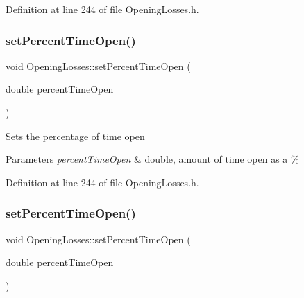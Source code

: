 Definition at line 244 of file Opening\+Losses.\+h.

\mbox{\label{class_opening_losses_a889b6aa25bf6d8fc8fb284ec0c2a1625}} 
\subsubsection{\texorpdfstring{set\+Percent\+Time\+Open()}{setPercentTimeOpen()}\hspace{0.1cm}{\footnotesize\ttfamily [2/3]}}
{\footnotesize\ttfamily void Opening\+Losses\+::set\+Percent\+Time\+Open (\begin{DoxyParamCaption}\item[{double}]{percent\+Time\+Open }\end{DoxyParamCaption})\hspace{0.3cm}{\ttfamily [inline]}}

Sets the percentage of time open 
\begin{DoxyParams}{Parameters}
{\em percent\+Time\+Open} & double, amount of time open as a \% \\
\hline
\end{DoxyParams}


Definition at line 244 of file Opening\+Losses.\+h.

\mbox{\label{class_opening_losses_a889b6aa25bf6d8fc8fb284ec0c2a1625}} 
\subsubsection{\texorpdfstring{set\+Percent\+Time\+Open()}{setPercentTimeOpen()}\hspace{0.1cm}{\footnotesize\ttfamily [3/3]}}
{\footnotesize\ttfamily void Opening\+Losses\+::set\+Percent\+Time\+Open (\begin{DoxyParamCaption}\item[{double}]{percent\+Time\+Open }\end{DoxyParamCaption})\hspace{0.3cm}{\ttfamily [inline]}}

